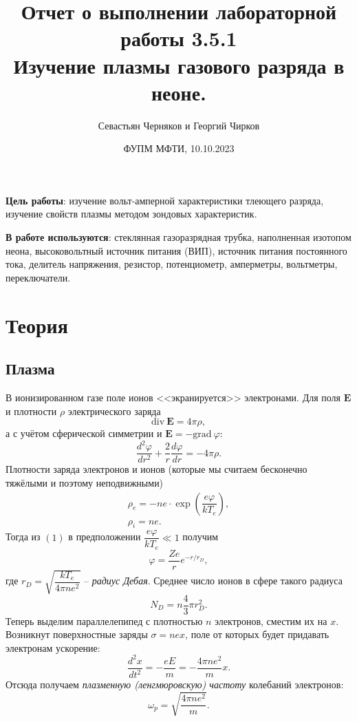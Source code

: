 \documentclass[a4paper,11pt]{extarticle} %
\title{Отчет о выполнении лабораторной работы 3.5.1 \\ 
\textbf{Изучение плазмы газового разряда в неоне.}}
\author{Севастьян Черняков и Георгий Чирков}
\date{ ФУПМ МФТИ, 10.10.2023 \\}
\begin{document}
\maketitle 

\textbf{Цель работы}: изучение вольт-амперной характеристики тлеющего разряда, изучение свойств плазмы методом зондовых характеристик.


\textbf{В работе используются}: стеклянная газоразрядная трубка, наполненная изотопом неона, высоковольтный источник питания (ВИП), источник питания постоянного тока, делитель напряжения, резистор, потенциометр, амперметры, вольтметры, переключатели.
\section*{Теория}
\subsection*{Плазма}
В ионизированном газе поле ионов <<экранируется>> электронами. Для поля $\mathbf{E}$ и плотности $\rho$ электрического заряда
$$
\text{div}~\mathbf{E} = 4 \pi \rho,
$$
а с учётом сферической симметрии и $\mathbf{E} = -\text{grad}~\varphi$:
\begin{equation}
\dfrac{d^2 \varphi}{dr^2}+\dfrac{2}{r}\dfrac{d\varphi}{dr}=-4\pi \rho.
\end{equation}
Плотности заряда электронов и ионов (которые мы считаем бесконечно тяжёлыми и поэтому неподвижными)
\begin{equation}
\begin{array}{c}
\rho_e = -ne \cdot \exp\left(\dfrac{e\varphi}{kT_e}\right),\\
\rho_i = ne.
\end{array}
\end{equation}
Тогда из $(1)$ в предположении $\dfrac{e\varphi}{kT_e} \ll 1$ получим
\begin{equation}
\varphi = \dfrac{Ze}{r}e^{-r/r_D},
\end{equation}
где $r_D = \sqrt{\dfrac{kT_e}{4\pi n e^2}}$ -- \textit{радиус Дебая}. Среднее число ионов в сфере такого радиуса 
\begin{equation}
N_D = n\dfrac{4}{3}\pi r_D^2.
\end{equation}
Теперь выделим параллелепипед с плотностью $n$ электронов, сместим их на $x$. Возникнут поверхностные заряды $\sigma = nex$, поле от которых будет придавать электронам ускорение:
$$
\dfrac{d^2x}{dt^2}=-\dfrac{eE}{m}=-\dfrac{4\pi n e^2}{m}x.
$$ 
Отсюда получаем \textit{плазменную (ленгмюровскую) частоту} колебаний электронов:
\begin{equation}
\omega_p = \sqrt{\dfrac{4\pi ne^2}{m}}.
\end{equation}
\end{document}
